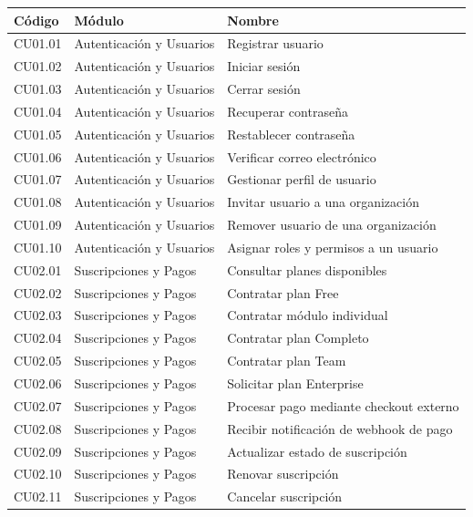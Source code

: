 \documentclass[11pt,a4paper]{article}
\begin{document}
\renewcommand{\arraystretch}{1.2}
\begin{longtable}{@{}>{\raggedright\arraybackslash}p{2.2cm} >{\raggedright\arraybackslash}p{4.3cm} >{\raggedright\arraybackslash}p{\dimexpr\textwidth-2.2cm-4.3cm-6\tabcolsep\relax}@{}}
\toprule
\textbf{C\'odigo} & \textbf{M\'odulo} & \textbf{Nombre} \\
\midrule
\endhead
\bottomrule
\endfoot
CU01.01 & Autenticaci\'on y Usuarios & Registrar usuario \\
CU01.02 & Autenticaci\'on y Usuarios & Iniciar sesi\'on \\
CU01.03 & Autenticaci\'on y Usuarios & Cerrar sesi\'on \\
CU01.04 & Autenticaci\'on y Usuarios & Recuperar contrase\~na \\
CU01.05 & Autenticaci\'on y Usuarios & Restablecer contrase\~na \\
CU01.06 & Autenticaci\'on y Usuarios & Verificar correo electr\'onico \\
CU01.07 & Autenticaci\'on y Usuarios & Gestionar perfil de usuario \\
CU01.08 & Autenticaci\'on y Usuarios & Invitar usuario a una organizaci\'on \\
CU01.09 & Autenticaci\'on y Usuarios & Remover usuario de una organizaci\'on \\
CU01.10 & Autenticaci\'on y Usuarios & Asignar roles y permisos a un usuario \\
\midrule
CU02.01 & Suscripciones y Pagos & Consultar planes disponibles \\
CU02.02 & Suscripciones y Pagos & Contratar plan Free \\
CU02.03 & Suscripciones y Pagos & Contratar m\'odulo individual \\
CU02.04 & Suscripciones y Pagos & Contratar plan Completo \\
CU02.05 & Suscripciones y Pagos & Contratar plan Team \\
CU02.06 & Suscripciones y Pagos & Solicitar plan Enterprise \\
CU02.07 & Suscripciones y Pagos & Procesar pago mediante checkout externo \\
CU02.08 & Suscripciones y Pagos & Recibir notificaci\'on de webhook de pago \\
CU02.09 & Suscripciones y Pagos & Actualizar estado de suscripci\'on \\
CU02.10 & Suscripciones y Pagos & Renovar suscripci\'on \\
CU02.11 & Suscripciones y Pagos & Cancelar suscripci\'on \\

\end{longtable}
\end{document}
